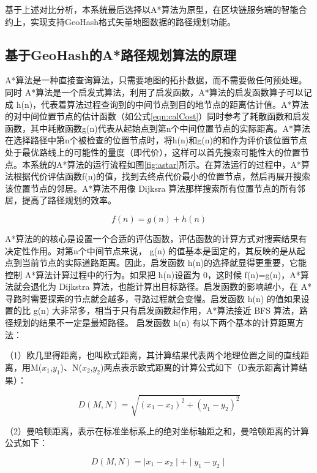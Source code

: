 基于上述对比分析，本系统最后选择以A*算法为原型，在区块链服务端的智能合约上，实现支持GeoHash格式矢量地图数据的路径规划功能。

\subsection{基于GeoHash的A*路径规划算法的原理}
A*算法是一种直接查询算法，只需要地图的拓扑数据，而不需要做任何预处理。同时 A*算法是一个启发式算法，利用了启发函数，A*算法的启发函数算子可以记成 h(n)，代表着算法过程查询到的中间节点到目的地节点的距离估计值。A*算法的对中间位置节点的估计函数（如公式\ref{eqn:calCost}）同时参考了耗散函数和启发函数，其中耗散函数g(n)代表从起始点到第n个中间位置节点的实际距离。A*算法在选择路径中第n个被检查的位置节点时，将h(n)和g(n)的和作为评价该位置节点处于最优路线上的可能性的量度（即代价），这样可以首先搜索可能性大的位置节点。本系统的A*算法的运行流程如图\ref{fig:astar}所示。在算法运行的过程中，A*算法根据代价评估函数f(n)的值，找到去终点代价最小的位置节点，然后再展开搜索该位置节点的邻居。A*算法不用像 Dijksra 算法那样搜索所有位置节点的所有邻居，提高了路径规划的效率。

\begin{equation}
  \label{eqn:calCost}
  f(n)=g(n)+h(n)
\end{equation}

A*算法的的核心是设置一个合适的评估函数，评估函数的计算方式对搜索结果有决定性作用。对第n个中间节点来说， g(n) 的值基本是固定的，其反映的是从起点到当前节点的实际道路距离。因此，启发函数 h(n)的选择就显得更重要，它能控制 A*算法计算过程中的行为。如果把 h(n)设置为 0，这时候 f(n)=g(n)，A*算法就会退化为 Dijkstra 算法，也能计算出目标路径。启发函数的影响越小，在 A*寻路时需要探索的节点就会越多，寻路过程就会变慢。启发函数 h(n) 的值如果设置的比 g(n) 大非常多，相当于只有启发函数起作用，A*算法接近 BFS 算法，路径规划的结果不一定是最短路径。
启发函数 h(n) 有以下两个基本的计算距离方法：

（1）欧几里得距离，也叫欧式距离，其计算结果代表两个地理位置之间的直线距离，用M($x_1$,$y_1$)、N($x_2$,$y_2$)两点表示欧式距离的计算公式如下（D表示距离计算结果）：

\begin{equation}
  \label{eqn:Euclid}
  D(M, N)=\sqrt{(x_1-x_2)^{2}+(y_1-y_2)^{2}}
\end{equation}

（2）曼哈顿距离，表示在标准坐标系上的绝对坐标轴距之和，曼哈顿距离的计算公式如下：

\begin{equation}
  \label{eqn:manhattan}
  D(M, N)=\mid x_1-x_2 \mid+\mid y_1-y_2 \mid
\end{equation}

